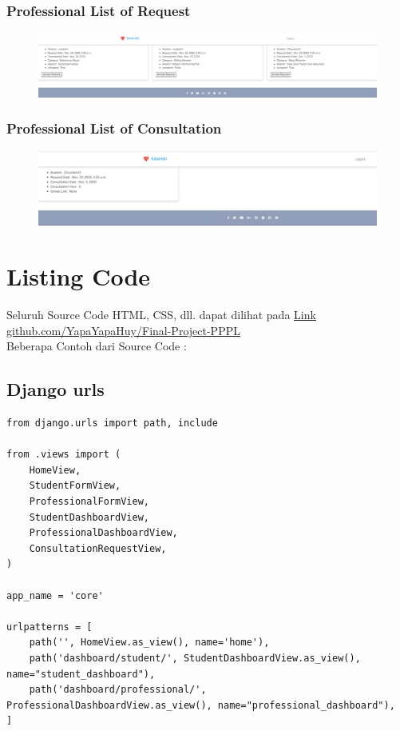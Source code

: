\documentclass{article}
\begin{document}
	\subsubsection{Professional List of Request}
	\begin{figure}[H]
		\centering
		\includegraphics[width=480px]{Prof List.png}
	\end{figure}

	\subsubsection{Professional List of Consultation}
	\begin{figure}[H]
		\centering
		\includegraphics[width=480px]{Prof Active List.png}
	\end{figure}

	\section{Listing Code}
	Seluruh Source Code HTML, CSS, dll. dapat dilihat pada \href{https://github.com/YapaYapaHuy/Final-Project-PPPL}{Link github.com/YapaYapaHuy/Final-Project-PPPL}
	\\
	Beberapa Contoh dari Source Code :
	\subsection{Django urls}
	\begin{verbatim}
from django.urls import path, include

from .views import (
    HomeView,
    StudentFormView,
    ProfessionalFormView,
    StudentDashboardView,
    ProfessionalDashboardView,
    ConsultationRequestView,
)

app_name = 'core'

urlpatterns = [
    path('', HomeView.as_view(), name='home'),
    path('dashboard/student/', StudentDashboardView.as_view(), name="student_dashboard"),
    path('dashboard/professional/', ProfessionalDashboardView.as_view(), name="professional_dashboard"),
]   
	\end{verbatim}
\end{document}
